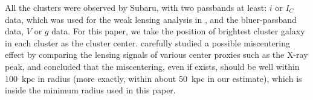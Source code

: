 \documentclass[iop, apj]{emulateapj}
\newcommand{\?}{\stackrel{?}{=}}
\begin{document}
All the clusters were observed by Subaru, with two passbands at least:
$i$ or $I_C$ data, which was used for the weak lensing analysis in
\citet{Okabeetal:13},
and the
bluer-passband data, $V$ or $g$ data.
For this paper, we
take the position of brightest cluster galaxy in each cluster as the
cluster center. \citet{Okabeetal:10} carefully studied a possible
miscentering effect by comparing the lensing signals of various center
proxies such as the X-ray peak, and concluded that the miscentering,
even if exists, should be well within 100~kpc in radius (more exactly,
within about 50~kpc in our estimate), which is inside the minimum radius
used in this paper.
\end{document}
